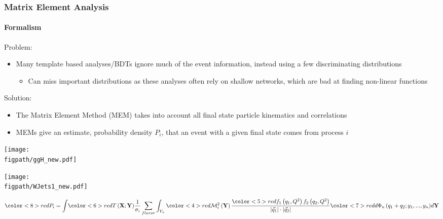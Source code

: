 \begin{frame}%
	\frametitle{Matrix Element Analysis}
	\framesubtitle{Formalism}
	\vspace*{-0.24cm}
	\footnotesize
	\begin{block}{Problem:}
	\begin{itemize}
		\item Many template based analyses/BDTs ignore much of the event information, instead using a few discriminating distributions
		\begin{itemize}
			\footnotesize
			\item Can miss important distributions as these analyses often rely on shallow networks, which are bad at finding non-linear functions
		\end{itemize}
	\end{itemize}
	\end{block}
	\vspace*{-0.24cm}
	\begin{block}{Solution:}
		\begin{itemize}
			\scriptsize
			\item The Matrix Element Method (MEM) takes into account all final state particle kinematics and correlations
			\item MEMs give an estimate, probability density $P_{i}$, that an event with a given final state comes from process $i$
		\end{itemize}
		\vspace*{-0.15cm}
		 {
			\begin{center}
				\texttt{[image: \\figpath/ggH\_new.pdf]}
			\end{center}
		}
		\only<2> {
			\begin{center}
				\texttt{[image: \\figpath/WJets1\_new.pdf]}
			\end{center}
		}
		\only<3-> {
		\begin{equation}\label{eq:MEM_probability}
{\color<8>{red}P_{i}}={\int}{\color<6>{red}T\left(\mathbf{X};\mathbf{Y}\right)}\frac{1}{\sigma_{i}}\sum_{flavor}\int_{V_{n}}{\color<4>{red}\mathcal{M}_{i}^{2}}\left(\mathbf{Y}\right)\frac{{\color<5>{red}f_{1}\left(q_{1},Q^{2}\right)f_{2}\left(q_{2},Q^{2}\right)}}{|\vec{q}_{1}|\cdot|\vec{q}_{2}|}{\color<7>{red}d\Phi_{n}\left(q_{1}+q_{2};y_{1},...,y_{n}\right)}d\mathbf{Y}

\end{equation}}
\end{block}
\end{frame}
